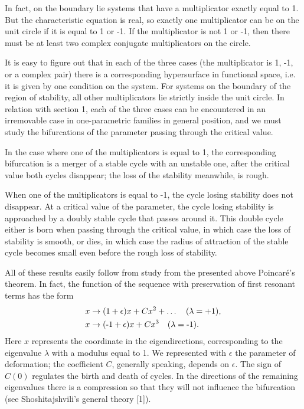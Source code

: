 \documentclass[12pt]{amsart}
\begin{document}
In fact, on the boundary lie systems that have a multiplicator exactly equal to 1.
But the characteristic equation is real, so exactly one multiplicator can be on
the unit circle if it is equal to 1 or -1.
If the multiplicator is not 1 or -1, then there must be at least two complex
conjugate multiplicators on the circle.

It is easy to figure out that in each of the three cases (the multiplicator is
1, -1, or a complex pair) there is a corresponding hypersurface in functional
space, i.e. it is given by one condition on the system.
For systems on the boundary of the region of stability, all other multiplicators
lie strictly inside the unit circle.
In relation with section 1, each of the three cases can be encountered in an
irremovable case in one-parametric families in general position, and we must
study the bifurcations of the parameter passing through the critical value.

In the case where one of the multiplicators is equal to 1, the corresponding
bifurcation is a merger of a stable cycle with an unstable one, after the
critical value both cycles disappear; the loss of the stability meanwhile, is
rough.

When one of the multiplicators is equal to -1, the cycle losing stability does
not disappear.
At a critical value of the parameter, the cycle losing stability is approached
by a doubly stable cycle that passes around it.
This double cycle either is born when passing through the critical value, in
which case the loss of stability is smooth, or dies, in which case the radius of
attraction of the stable cycle becomes small even before the rough loss of
stability.

All of these results easily follow from study from the presented above
Poincar\'e's theorem.
In fact, the function of the sequence with preservation of first resonant terms
has the form
\begin{align*}
&x\to(1+\epsilon)x+Cx^2+\dots\quad(\lambda=+1),\\
&x\to(\text-1+\epsilon)x+Cx^3\quad(\lambda=\text-1).
\end{align*}
Here $x$ represents the coordinate in the eigendirections, corresponding to the
eigenvalue $\lambda$ with a modulus equal to 1.
We represented with $\epsilon$ the parameter of deformation; the coefficient
$C$, generally speaking, depends on $\epsilon$.
The sign of $C(0)$ regulates the birth and death of cycles.
In the directions of the remaining eigenvalues there is a compression so that
they will not influence the bifurcation (see Shoshitajshvili's general theory
[1]).
\end{document}
